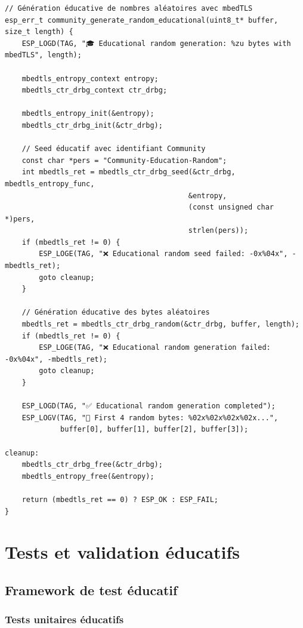 \begin{lstlisting}[caption={Optimisations éducatives avec mbedTLS}]
// Génération éducative de nombres aléatoires avec mbedTLS
esp_err_t community_generate_random_educational(uint8_t* buffer, size_t length) {
    ESP_LOGD(TAG, "🎓 Educational random generation: %zu bytes with mbedTLS", length);
    
    mbedtls_entropy_context entropy;
    mbedtls_ctr_drbg_context ctr_drbg;
    
    mbedtls_entropy_init(&entropy);
    mbedtls_ctr_drbg_init(&ctr_drbg);
    
    // Seed éducatif avec identifiant Community
    const char *pers = "Community-Education-Random";
    int mbedtls_ret = mbedtls_ctr_drbg_seed(&ctr_drbg, mbedtls_entropy_func, 
                                           &entropy, 
                                           (const unsigned char *)pers, 
                                           strlen(pers));
    if (mbedtls_ret != 0) {
        ESP_LOGE(TAG, "❌ Educational random seed failed: -0x%04x", -mbedtls_ret);
        goto cleanup;
    }
    
    // Génération éducative des bytes aléatoires
    mbedtls_ret = mbedtls_ctr_drbg_random(&ctr_drbg, buffer, length);
    if (mbedtls_ret != 0) {
        ESP_LOGE(TAG, "❌ Educational random generation failed: -0x%04x", -mbedtls_ret);
        goto cleanup;
    }
    
    ESP_LOGD(TAG, "✅ Educational random generation completed");
    ESP_LOGV(TAG, "🎲 First 4 random bytes: %02x%02x%02x%02x...", 
             buffer[0], buffer[1], buffer[2], buffer[3]);

cleanup:
    mbedtls_ctr_drbg_free(&ctr_drbg);
    mbedtls_entropy_free(&entropy);
    
    return (mbedtls_ret == 0) ? ESP_OK : ESP_FAIL;
}
\end{lstlisting}

\section{Tests et validation éducatifs}

\subsection{Framework de test éducatif}

\subsubsection{Tests unitaires éducatifs}


